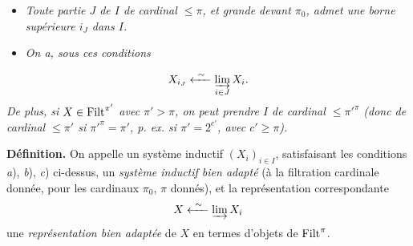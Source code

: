 \begin{itemize}
\item[b)] \textit{Toute partie $J$ de $I$ de cardinal $\le\pi$, et grande devant $\pi_0$, admet une borne supérieure $i_J$ dans $I$.}
\item[c)] \textit{On a, sous ces conditions}
\end{itemize}

\[
X_{i_J} \xleftarrow{\ \sim\ } \varinjlim_{i\in J} X_i .
\]
\textit{De plus, si $X\in\mathrm{Filt}^{\pi'}$ avec $\pi'>\pi$, on peut prendre $I$ de cardinal $\le\pi'^{\pi}$ (donc de cardinal $\le\pi'$ si $\pi'^{\pi}=\pi'$, p. ex. si $\pi'=2^{c'}$, avec $c'\ge\pi$).}

\textbf{Définition.} On appelle un système inductif $(X_i)_{i\in I}$, satisfaisant les conditions \textit{a}), \textit{b}), \textit{c}) ci-dessus, un \textit{système inductif bien adapté} (à la filtration cardinale donnée, pour les cardinaux $\pi_0$, $\pi$ donnés), et la représentation correspondante
\[
X \xleftarrow{\ \sim\ } \varinjlim X_i
\]
une \textit{représentation bien adaptée} de $X$ en termes d'objets de $\mathrm{Filt}^\pi$.

